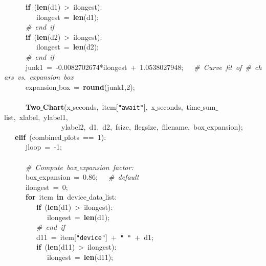 \mbox{}\ \ \ \ \ \ \textbf{if}\ (\textbf{len}(d1)\ \textgreater{}\ ilongest): \\
\mbox{}\ \ \ \ \ \ \ \ \ ilongest\ =\ \textbf{len}(d1); \\
\mbox{}\ \ \ \ \ \ \textit{\#\ end\ if} \\
\mbox{}\ \ \ \ \ \ \textbf{if}\ (\textbf{len}(d2)\ \textgreater{}\ ilongest): \\
\mbox{}\ \ \ \ \ \ \ \ \ ilongest\ =\ \textbf{len}(d2); \\
\mbox{}\ \ \ \ \ \ \textit{\#\ end\ if} \\
\mbox{}\ \ \ \ \ \ junk1\ =\ -0.0082702674*ilongest\ +\ 1.0538027948;\ \ \ \textit{\#\ Curve\ fit\ of\ \#\ chars\ vs.\ expansion\ box} \\
\mbox{}\ \ \ \ \ \ expansion$\_$box\ =\ \textbf{round}(junk1,2); \\
\mbox{}\ \ \ \ \ \  \\
\mbox{}\ \ \ \ \ \ \textbf{Two$\_$Chart}(x$\_$seconds,\ item[\texttt{"{}await"{}}],\ x$\_$seconds,\ time$\_$sum$\_$list,\ xlabel,\ ylabel1,\  \\
\mbox{}\ \ \ \ \ \ \ \ \ \ \ \ \ \ \ \ ylabel2,\ d1,\ d2,\ fsize,\ flegsize,\ filename,\ box$\_$expansion); \\
\mbox{}\ \ \ \textbf{elif}\ (combined$\_$plots\ ==\ 1): \\
\mbox{}\ \ \ \ \ \ jloop\ =\ -1; \\
\mbox{}\ \ \ \ \ \  \\
\mbox{}\ \ \ \ \ \ \textit{\#\ Compute\ box$\_$expansion\ factor:} \\
\mbox{}\ \ \ \ \ \ box$\_$expansion\ =\ 0.86;\ \ \ \textit{\#\ default} \\
\mbox{}\ \ \ \ \ \ ilongest\ =\ 0; \\
\mbox{}\ \ \ \ \ \ \textbf{for}\ item\ \textbf{in}\ device$\_$data$\_$list: \\
\mbox{}\ \ \ \ \ \ \ \ \ \textbf{if}\ (\textbf{len}(d1)\ \textgreater{}\ ilongest): \\
\mbox{}\ \ \ \ \ \ \ \ \ \ \ \ ilongest\ =\ \textbf{len}(d1); \\
\mbox{}\ \ \ \ \ \ \ \ \ \textit{\#\ end\ if} \\
\mbox{}\ \ \ \ \ \ \ \ \ d11\ =\ item[\texttt{"{}device"{}}]\ +\ \texttt{"{}\ "{}}\ +\ d1; \\
\mbox{}\ \ \ \ \ \ \ \ \ \textbf{if}\ (\textbf{len}(d11)\ \textgreater{}\ ilongest): \\
\mbox{}\ \ \ \ \ \ \ \ \ \ \ \ ilongest\ =\ \textbf{len}(d11); \\

